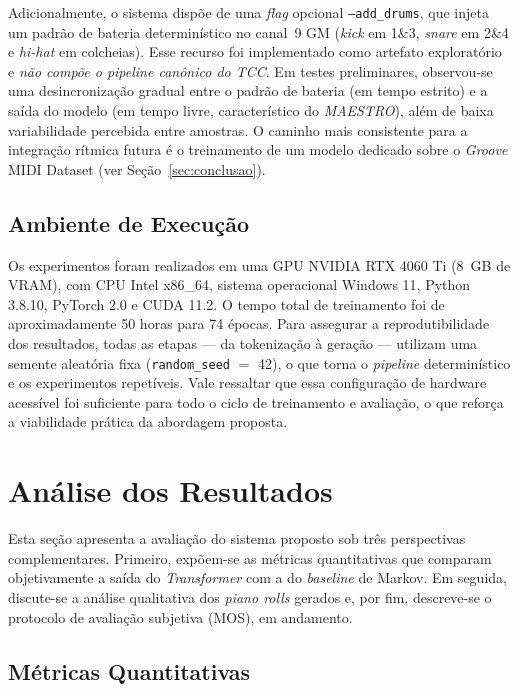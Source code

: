 \documentclass[12pt]{article}
\begin{document}
Adicionalmente, o sistema dispõe de uma \emph{flag} opcional
\texttt{--add\_drums}, que injeta um padrão de bateria determinístico no canal~9
GM (\emph{kick} em 1\&3, \emph{snare} em 2\&4 e \emph{hi-hat} em colcheias). Esse
recurso foi implementado como artefato exploratório e \emph{não compõe o pipeline
canônico do TCC}. Em testes preliminares, observou-se uma desincronização gradual
entre o padrão de bateria (em tempo estrito) e a saída do modelo (em tempo livre,
característico do \emph{MAESTRO}), além de baixa variabilidade percebida entre amostras. O
caminho mais consistente para a integração rítmica futura é o treinamento de um
modelo dedicado sobre o \emph{Groove} MIDI Dataset (ver Seção~\ref{sec:conclusao}).

\subsection{Ambiente de Execução}

Os experimentos foram realizados em uma GPU NVIDIA RTX 4060 Ti (8~GB de VRAM),
com CPU Intel x86\_64, sistema operacional Windows 11, Python 3.8.10, PyTorch 2.0
e CUDA 11.2. O tempo total de treinamento foi de aproximadamente 50 horas para 74
épocas. Para assegurar a reprodutibilidade dos resultados, todas as etapas ---
da tokenização à geração --- utilizam uma semente aleatória fixa
(\texttt{random\_seed} $=$ 42), o que torna o \emph{pipeline} determinístico e os
experimentos repetíveis. Vale ressaltar que essa configuração de hardware
acessível foi suficiente para todo o ciclo de treinamento e avaliação, o que
reforça a viabilidade prática da abordagem proposta.

\section{Análise dos Resultados}

Esta seção apresenta a avaliação do sistema proposto sob três perspectivas
complementares. Primeiro, expõem-se as métricas quantitativas que comparam
objetivamente a saída do \emph{Transformer} com a do \emph{baseline} de Markov. Em
seguida, discute-se a análise qualitativa dos \emph{piano rolls} gerados e, por
fim, descreve-se o protocolo de avaliação subjetiva (MOS), em andamento.

\subsection{Métricas Quantitativas}
\end{document}
